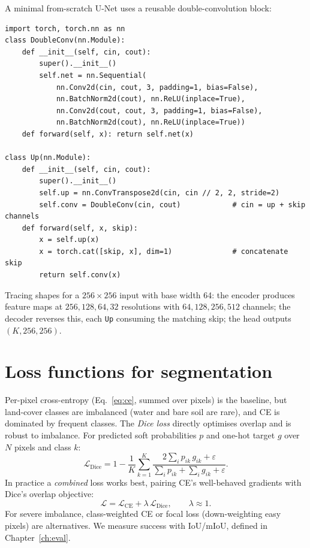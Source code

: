 A minimal from-scratch U-Net uses a reusable double-convolution block:
\begin{lstlisting}
import torch, torch.nn as nn
class DoubleConv(nn.Module):
    def __init__(self, cin, cout):
        super().__init__()
        self.net = nn.Sequential(
            nn.Conv2d(cin, cout, 3, padding=1, bias=False),
            nn.BatchNorm2d(cout), nn.ReLU(inplace=True),
            nn.Conv2d(cout, cout, 3, padding=1, bias=False),
            nn.BatchNorm2d(cout), nn.ReLU(inplace=True))
    def forward(self, x): return self.net(x)

class Up(nn.Module):
    def __init__(self, cin, cout):
        super().__init__()
        self.up = nn.ConvTranspose2d(cin, cin // 2, 2, stride=2)
        self.conv = DoubleConv(cin, cout)            # cin = up + skip channels
    def forward(self, x, skip):
        x = self.up(x)
        x = torch.cat([skip, x], dim=1)              # concatenate skip
        return self.conv(x)
\end{lstlisting}
Tracing shapes for a $256\times256$ input with base width 64: the encoder
produces feature maps at $256,128,64,32$ resolutions with $64,128,256,512$
channels; the decoder reverses this, each \texttt{Up} consuming the matching
skip; the head outputs $(K,256,256)$.

\section{Loss functions for segmentation}

Per-pixel cross-entropy (Eq.~\ref{eq:ce}, summed over pixels) is the baseline,
but land-cover classes are imbalanced (water and bare soil are rare), and CE is
dominated by frequent classes. The \emph{Dice loss} directly optimises overlap
and is robust to imbalance. For predicted soft probabilities $p$ and one-hot
target $g$ over $N$ pixels and class $k$:
\begin{equation}
\mathcal{L}_{\mathrm{Dice}} = 1 - \frac{1}{K}\sum_{k=1}^{K}
\frac{2\sum_i p_{ik}\,g_{ik} + \varepsilon}{\sum_i p_{ik} + \sum_i g_{ik} + \varepsilon}.
\label{eq:dice}
\end{equation}
In practice a \emph{combined} loss works best, pairing CE's well-behaved
gradients with Dice's overlap objective:
\begin{equation}
\mathcal{L} = \mathcal{L}_{\mathrm{CE}} + \lambda\,\mathcal{L}_{\mathrm{Dice}},
\qquad \lambda \approx 1.
\end{equation}
For severe imbalance, class-weighted CE or focal loss (down-weighting easy
pixels) are alternatives. We measure success with IoU/mIoU, defined in
Chapter~\ref{ch:eval}.

